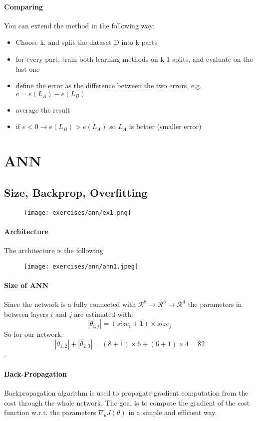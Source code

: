 \paragraph{Comparing}
You can extend the method in the following way:
\begin{itemize}
\item Choose k, and split the dataset D into k parts
\item for every part, train both learning methods on k-1 splits, and evaluate on the last one
\item define the error as the difference between the two errors, e.g. $e=e(L_A)-e(L_B)$
\item average the result
\item if $e<0 \to e(L_B)>e(L_A)$ so  $L_A$ is better (smaller error) 
\end{itemize}

\section{ANN}

\subsection{Size, Backprop, Overfitting}
\begin{figure}[H]
    \centering
    \texttt{[image: exercises/ann/ex1.png]}
\end{figure}


\paragraph{Architecture}
The architecture is the following
\begin{figure}[H]
    \centering
    \texttt{[image: exercises/ann/ann1.jpeg]}
\end{figure}

\paragraph{Size of ANN}
Since the network is a fully connected with $\mathcal{R}^8\rightarrow\mathcal{R}^6\to \mathcal{R}^4$ the parameters in between layers $i$ and $j$ are estimated with:
$$|\theta_{i,j}|=(size_i+1)\times size_j$$
So for our network:
$$|\theta_{1,2}|+|\theta_{2,3}|=(8 +1) \times 6+(6 +1) \times 4=82$$
.



\paragraph{Back-Propagation}
Backpropagation algorithm is used to propagate gradient computation from the cost through the whole network. The goal is to compute the gradient of the cost function w.r.t. the parameters $\nabla_{\theta}J(\theta)$ in a simple and efficient way.

